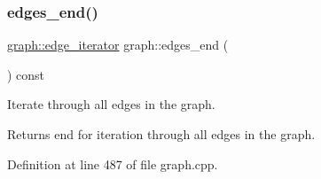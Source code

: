 \subsubsection{\texorpdfstring{edges\+\_\+end()}{edges\_end()}}
{\footnotesize\ttfamily \mbox{\hyperlink{classgraph_a818d3766018eb0af91d520ce2150203c}{graph\+::edge\+\_\+iterator}} graph\+::edges\+\_\+end (\begin{DoxyParamCaption}{ }\end{DoxyParamCaption}) const\hspace{0.3cm}{\ttfamily [inherited]}}

Iterate through all edges in the graph.

\begin{DoxyReturn}{Returns}
end for iteration through all edges in the graph. 
\end{DoxyReturn}


Definition at line 487 of file graph.\+cpp.


